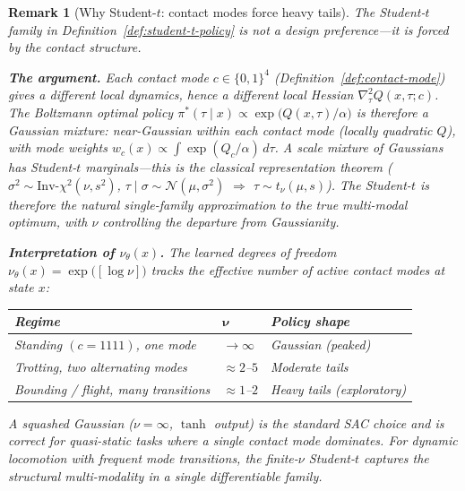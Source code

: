 \documentclass[11pt,a4paper]{article}
\newtheorem{remark}[theorem]{Remark}
\begin{document}
\begin{remark}[Why Student-$t$: contact modes force heavy tails]
\label{rem:student-t-forced}
The Student-$t$ family in
Definition~\ref{def:student-t-policy}
is not a design preference---it is forced
by the contact structure.

\medskip\noindent
\textbf{The argument.}\;
Each contact mode
$c \in \{0,1\}^4$
(Definition~\ref{def:contact-mode})
gives a different local dynamics,
hence a different local Hessian
$\nabla^2_\tau Q(x, \tau; c)$.
The Boltzmann optimal policy
$\pi^*(\tau \mid x)
  \propto \exp\!\bigl(Q(x,\tau)/\alpha\bigr)$
is therefore a \emph{Gaussian mixture}:
near-Gaussian within each contact mode
(locally quadratic $Q$),
with mode weights
$w_c(x) \propto
  \int \exp(Q_c / \alpha)\,d\tau$.
A scale mixture of Gaussians
has Student-$t$ marginals---this is the
classical representation theorem
($\sigma^2 \sim
  \mathrm{Inv}\text{-}\chi^2(\nu, s^2)$,\;
$\tau \mid \sigma \sim \mathcal{N}(\mu, \sigma^2)$\;
$\Rightarrow$\;
$\tau \sim t_\nu(\mu, s)$).
The Student-$t$ is therefore the
natural single-family approximation
to the true multi-modal optimum,
with $\nu$ controlling
the departure from Gaussianity.

\medskip\noindent
\textbf{Interpretation of $\nu_\theta(x)$.}\;
The learned degrees of freedom
$\nu_\theta(x) = \exp\!\bigl([\log\nu]\bigr)$
tracks the effective number of
active contact modes at state $x$:

\smallskip
\begin{center}
\begin{tabular}{@{}lll@{}}
\toprule
\textbf{Regime} & $\boldsymbol{\nu}$
  & \textbf{Policy shape} \\
\midrule
Standing $(c = 1111)$, one mode
  & $\to \infty$ & Gaussian (peaked) \\
Trotting, two alternating modes
  & $\approx 2$--$5$ & Moderate tails \\
Bounding / flight, many transitions
  & $\approx 1$--$2$ & Heavy tails (exploratory) \\
\bottomrule
\end{tabular}
\end{center}

\smallskip\noindent
A squashed Gaussian
($\nu = \infty$, $\tanh$ output)
is the standard SAC choice
and is correct for quasi-static tasks
where a single contact mode dominates.
For dynamic locomotion with frequent mode
transitions, the finite-$\nu$ Student-$t$
captures the structural multi-modality
in a single differentiable family.


\end{remark}
\end{document}
